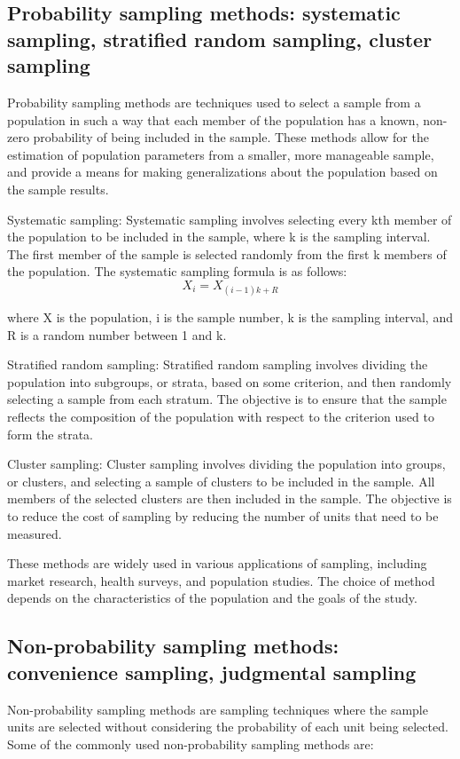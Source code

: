 \documentclass[12pt, a4paper, oneside]{article}
\begin{document}
\subsection{ Probability sampling methods: systematic sampling, stratified random sampling, cluster sampling }
Probability sampling methods are techniques used to select a sample from a population in such a way that each member of the population has a known, non-zero probability of being included in the sample. These methods allow for the estimation of population parameters from a smaller, more manageable sample, and provide a means for making generalizations about the population based on the sample results.

Systematic sampling: Systematic sampling involves selecting every kth member of the population to be included in the sample, where k is the sampling interval. The first member of the sample is selected randomly from the first k members of the population. The systematic sampling formula is as follows:
$$ X_i = X_{(i-1)k + R} $$

where X is the population, i is the sample number, k is the sampling interval, and R is a random number between 1 and k.

Stratified random sampling: Stratified random sampling involves dividing the population into subgroups, or strata, based on some criterion, and then randomly selecting a sample from each stratum. The objective is to ensure that the sample reflects the composition of the population with respect to the criterion used to form the strata.

Cluster sampling: Cluster sampling involves dividing the population into groups, or clusters, and selecting a sample of clusters to be included in the sample. All members of the selected clusters are then included in the sample. The objective is to reduce the cost of sampling by reducing the number of units that need to be measured.

These methods are widely used in various applications of sampling, including market research, health surveys, and population studies. The choice of method depends on the characteristics of the population and the goals of the study.

\subsection{ Non-probability sampling methods: convenience sampling, judgmental sampling }
Non-probability sampling methods are sampling techniques where the sample units are selected without considering the probability of each unit being selected. Some of the commonly used non-probability sampling methods are:
\end{document}
